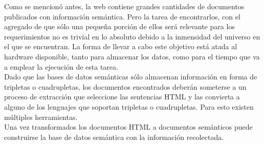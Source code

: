 Como se mencionó antes, la web contiene grandes cantidades de documentos publicados con información semántica. Pero la tarea
de encontrarlos, con el agregado de que sólo una pequeña porción de ellos será relevante para los requerimientos no es trivial
en lo absoluto debido a la inmensidad del universo en el que se encuentran. La forma de llevar a cabo este objetivo está 
atada al hardware disponible, tanto para almacenar los datos, como para el tiempo que va a emplear la ejecución de esta 
tarea. \\
Dado que las bases de datos semánticas sólo almacenan información en forma de tripletas o cuadrupletas, los documentos encontrados 
deberán someterse a un proceso de extracción que seleccione las sentencias HTML y las convierta a alguno de los lenguajes que soportan  
tripletas o cuadrupletas. Para esto existen múltiples herramientas.\\
Una vez transformados los documentos HTML a documentos semánticos puede construirse la base de datos semántica con la información 
recolectada.\\